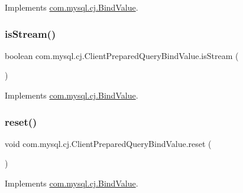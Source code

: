 Implements \mbox{\hyperlink{interfacecom_1_1mysql_1_1cj_1_1_bind_value_a559abc1794dd2783db255ab3b341fa70}{com.\+mysql.\+cj.\+Bind\+Value}}.

\mbox{\label{classcom_1_1mysql_1_1cj_1_1_client_prepared_query_bind_value_a624753143b95fbec245f37b73d41710f}} 
\subsubsection{\texorpdfstring{is\+Stream()}{isStream()}}
{\footnotesize\ttfamily boolean com.\+mysql.\+cj.\+Client\+Prepared\+Query\+Bind\+Value.\+is\+Stream (\begin{DoxyParamCaption}{ }\end{DoxyParamCaption})}



Implements \mbox{\hyperlink{interfacecom_1_1mysql_1_1cj_1_1_bind_value_ab00e3f54fd1417769cb9ae5ea54c0983}{com.\+mysql.\+cj.\+Bind\+Value}}.

\mbox{\label{classcom_1_1mysql_1_1cj_1_1_client_prepared_query_bind_value_aac106a5094f15af61d1921bf89af5668}} 
\subsubsection{\texorpdfstring{reset()}{reset()}}
{\footnotesize\ttfamily void com.\+mysql.\+cj.\+Client\+Prepared\+Query\+Bind\+Value.\+reset (\begin{DoxyParamCaption}{ }\end{DoxyParamCaption})}



Implements \mbox{\hyperlink{interfacecom_1_1mysql_1_1cj_1_1_bind_value_aeff59ff50904893a11b96f2ff560f974}{com.\+mysql.\+cj.\+Bind\+Value}}.

